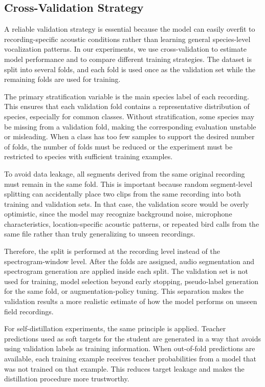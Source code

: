 \documentclass[a4paper,12pt]{article}
\begin{document}
\subsection{Cross-Validation Strategy}

A reliable validation strategy is essential because the model can easily overfit to recording-specific acoustic conditions rather than learning general species-level vocalization patterns. In our experiments, we use cross-validation to estimate model performance and to compare different training strategies. The dataset is split into several folds, and each fold is used once as the validation set while the remaining folds are used for training.

The primary stratification variable is the main species label of each recording. This ensures that each validation fold contains a representative distribution of species, especially for common classes. Without stratification, some species may be missing from a validation fold, making the corresponding evaluation unstable or misleading. When a class has too few samples to support the desired number of folds, the number of folds must be reduced or the experiment must be restricted to species with sufficient training examples.

To avoid data leakage, all segments derived from the same original recording must remain in the same fold. This is important because random segment-level splitting can accidentally place two clips from the same recording into both training and validation sets. In that case, the validation score would be overly optimistic, since the model may recognize background noise, microphone characteristics, location-specific acoustic patterns, or repeated bird calls from the same file rather than truly generalizing to unseen recordings.

Therefore, the split is performed at the recording level instead of the spectrogram-window level. After the folds are assigned, audio segmentation and spectrogram generation are applied inside each split. The validation set is not used for training, model selection beyond early stopping, pseudo-label generation for the same fold, or augmentation-policy tuning. This separation makes the validation results a more realistic estimate of how the model performs on unseen field recordings.

For self-distillation experiments, the same principle is applied. Teacher predictions used as soft targets for the student are generated in a way that avoids using validation labels as training information. When out-of-fold predictions are available, each training example receives teacher probabilities from a model that was not trained on that example. This reduces target leakage and makes the distillation procedure more trustworthy.
\end{document}

